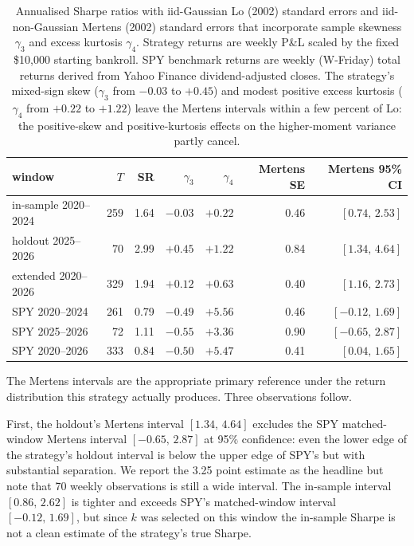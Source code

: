 \documentclass[11pt]{article}
\begin{document}
\begin{table}[htbp]
\centering
\footnotesize
\begin{tabular}{lrrrrrr}
\toprule
window & $T$ & SR & $\gamma_3$ & $\gamma_4$ & Mertens SE & Mertens 95\% CI \\
\midrule
in-sample 2020--2024 & 259 & 1.64 & $-0.03$ & $+0.22$ & 0.46 & $[0.74,\,2.53]$ \\
holdout 2025--2026   &  70 & 2.99 & $+0.45$ & $+1.22$ & 0.84 & $[1.34,\,4.64]$ \\
extended 2020--2026  & 329 & 1.94 & $+0.12$ & $+0.63$ & 0.40 & $[1.16,\,2.73]$ \\
\midrule
SPY 2020--2024       & 261 & 0.79 & $-0.49$ & $+5.56$ & 0.46 & $[-0.12,\,1.69]$ \\
SPY 2025--2026       &  72 & 1.11 & $-0.55$ & $+3.36$ & 0.90 & $[-0.65,\,2.87]$ \\
SPY 2020--2026       & 333 & 0.84 & $-0.50$ & $+5.47$ & 0.41 & $[0.04,\,1.65]$ \\
\bottomrule
\end{tabular}
\caption{Annualised Sharpe ratios with iid-Gaussian Lo (2002) standard
errors and iid-non-Gaussian Mertens (2002) standard errors that
incorporate sample skewness $\gamma_3$ and excess kurtosis $\gamma_4$.
Strategy returns are weekly P\&L scaled by the fixed \$10{,}000
starting bankroll. SPY benchmark returns are weekly (W-Friday) total
returns derived from Yahoo Finance dividend-adjusted closes. The
strategy's mixed-sign skew ($\gamma_3$ from $-0.03$ to $+0.45$)
and modest positive excess kurtosis ($\gamma_4$ from $+0.22$ to $+1.22$)
leave the Mertens intervals within a few percent of Lo: the
positive-skew and positive-kurtosis effects on the higher-moment
variance partly cancel.}
\label{tab:sharpe-ci}
\end{table}

The Mertens intervals are the appropriate primary reference under the
return distribution this strategy actually produces. Three observations
follow.

First, the holdout's Mertens interval $[1.34,\,4.64]$ excludes the
SPY matched-window Mertens interval $[-0.65,\,2.87]$ at 95\%
confidence: even the lower edge of the strategy's holdout interval
is below the upper edge of SPY's but with substantial separation.
We report the 3.25 point estimate as the headline but note that 70
weekly observations is still a wide interval. The in-sample interval
$[0.86,\,2.62]$ is tighter and exceeds SPY's matched-window interval
$[-0.12,\,1.69]$, but since $k$ was selected on this window the
in-sample Sharpe is not a clean estimate of the strategy's true
Sharpe.
\end{document}
